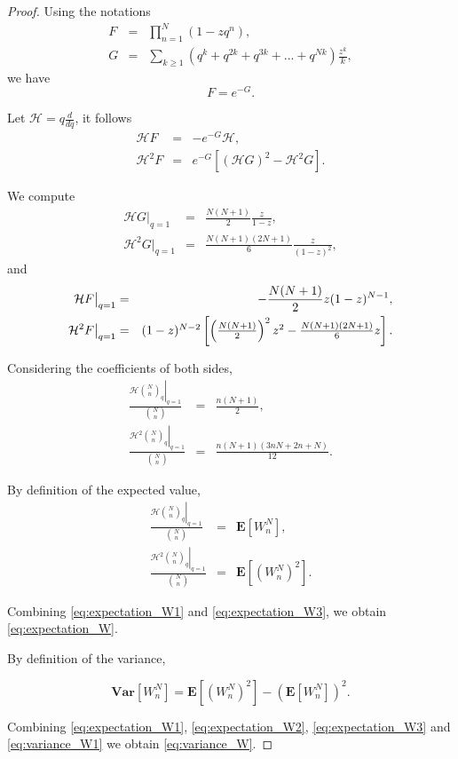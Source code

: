 \documentclass[12pt]{article} %
\theoremstyle{remark}
\begin{document}
\begin{proof}
Using the notations
\begin{eqnarray}
F &=& \prod_{n=1}^N \left( 1 - z q^n\right), \\
G &=& \sum_{k\geq 1} \left(q^k + q^{2k} + q^{3k} + ... + q^{Nk}  \right) \frac{z^k}{k},
\end{eqnarray}
we have
\begin{equation}
F = e^{-G}.
\end{equation}

Let $\mathcal{H} = q\frac{d}{dq}$, it follows
\begin{eqnarray}
\mathcal{H} F &=& - e^{-G} \mathcal{H}, \\
\mathcal{H}^2 F &=& e^{-G} \left[ \left(\mathcal{H} G\right)^2 - \mathcal{H}^2 G \right] .
\end{eqnarray}

We compute 
\begin{eqnarray}
\mathcal{H} G \big|_{q=1} &=& \frac{N(N+1)}{2} \frac{z}{1-z}, \\
\mathcal{H}^2 G \big|_{q=1} &=& \frac{N(N+1)(2N+1)}{6} \frac{z}{(1-z)^2},
\end{eqnarray}
and
\begin{eqnarray}
\mathcal{H} F \big|_{q=1} &=& -\frac{N(N+1)}{2} z(1-z)^{N-1}, \\
\mathcal{H}^2 F \big|_{q=1} &=& \scalebox{1}{$(1-z)^{N-2}\left[ \left(\frac{N(N+1)}{2} \right)^2 z^2 - \frac{N(N+1)(2N+1)}{6} z  \right].$}
\end{eqnarray}

Considering the coefficients of both sides,
\begin{eqnarray}
\label{eq:expectation_W1} \frac{\mathcal{H} \left.\binom{N}{n}_q\right|_{q=1}}{\binom{N}{n}} &=& \frac{n(N+1)}{2}, \\
\label{eq:expectation_W2} \frac{\mathcal{H}^2 \left.\binom{N}{n}_q\right|_{q=1}}{\binom{N}{n}} &=& \frac{n(N+1)(3nN+2n+N)}{12}.
\end{eqnarray}

By definition of the expected value,
\begin{eqnarray}
\label{eq:expectation_W3} \frac{\mathcal{H} \left.\binom{N}{n}_q\right|_{q=1}}{\binom{N}{n}} &=& \mathbf{E}\left[W^N_n\right], \\
\label{eq:expectation_W4} \frac{\mathcal{H}^2 \left.\binom{N}{n}_q\right|_{q=1}}{\binom{N}{n}} &=& \mathbf{E}\left[\left(W^N_n\right)^2\right].
\end{eqnarray}

Combining \eqref{eq:expectation_W1} and \eqref{eq:expectation_W3}, we obtain \eqref{eq:expectation_W}.

By definition of the variance,

\begin{equation}
\label{eq:variance_W1}
\mathbf{Var}\left[W^N_n\right] = \mathbf{E}\left[\left(W^N_n\right)^2\right] - \left(\mathbf{E}\left[W^N_n\right] \right)^2.
\end{equation}

Combining \eqref{eq:expectation_W1}, \eqref{eq:expectation_W2}, \eqref{eq:expectation_W3} and \eqref{eq:variance_W1} we obtain \eqref{eq:variance_W}.
\end{proof}
\end{document}
